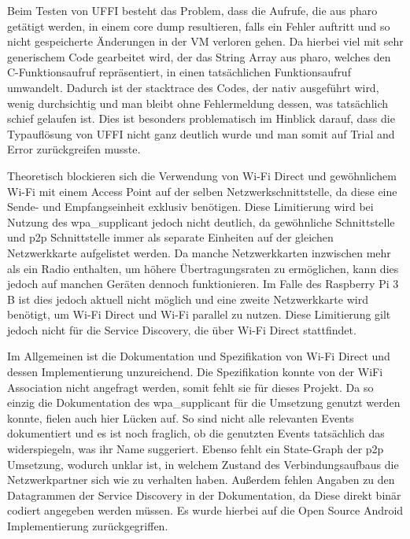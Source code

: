 		Beim Testen von UFFI besteht das Problem, dass die Aufrufe, die aus pharo getätigt werden, in einem core dump resultieren, falls ein Fehler auftritt und so nicht gespeicherte Änderungen in der VM verloren gehen. Da hierbei viel mit sehr generischem Code gearbeitet wird, der das String Array aus pharo, welches den C-Funktionsaufruf repräsentiert, in einen tatsächlichen Funktionsaufruf umwandelt. Dadurch ist der stacktrace des Codes, der nativ ausgeführt wird, wenig durchsichtig und man bleibt ohne Fehlermeldung dessen, was tatsächlich schief gelaufen ist. Dies ist besonders problematisch im Hinblick darauf, dass die Typauflösung von UFFI nicht ganz deutlich wurde und man somit auf Trial and Error zurückgreifen musste.
		
		Theoretisch blockieren sich die Verwendung von Wi-Fi Direct und gewöhnlichem Wi-Fi mit einem Access Point auf der selben Netzwerkschnittstelle, da diese eine Sende- und Empfangseinheit exklusiv benötigen. Diese Limitierung wird bei Nutzung des wpa\_supplicant jedoch nicht deutlich, da gewöhnliche Schnittstelle und p2p Schnittstelle immer als separate Einheiten auf der gleichen Netzwerkkarte aufgelistet werden. Da manche Netzwerkkarten inzwischen mehr als ein Radio enthalten, um höhere Übertragungsraten zu ermöglichen, kann dies jedoch auf manchen Geräten dennoch funktionieren. Im Falle des Raspberry Pi 3 B ist dies jedoch aktuell nicht möglich und eine zweite Netzwerkkarte wird benötigt, um Wi-Fi Direct und Wi-Fi parallel zu nutzen. Diese Limitierung gilt jedoch nicht für die Service Discovery, die über Wi-Fi Direct stattfindet.
		
		Im Allgemeinen ist die Dokumentation und Spezifikation von Wi-Fi Direct und dessen Implementierung unzureichend. Die Spezifikation konnte von der WiFi Association nicht angefragt werden, somit fehlt sie für dieses Projekt. Da so einzig die Dokumentation des wpa\_supplicant für die Umsetzung genutzt werden konnte, fielen auch hier Lücken auf. So sind nicht alle relevanten Events dokumentiert und es ist noch fraglich, ob die genutzten Events tatsächlich das widerspiegeln, was ihr Name suggeriert. Ebenso fehlt ein State-Graph der p2p Umsetzung, wodurch unklar ist, in welchem Zustand des Verbindungsaufbaus die Netzwerkpartner sich wie zu verhalten haben. Außerdem fehlen Angaben zu den Datagrammen der Service Discovery in der Dokumentation, da Diese direkt binär codiert angegeben werden müssen. Es wurde hierbei auf die Open Source Android Implementierung zurückgegriffen.\cite{androidRepo}
		
